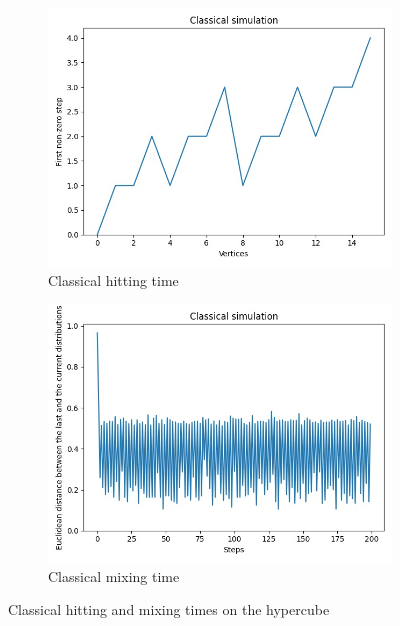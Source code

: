 \begin{figure}[H]
  \centering
  \begin{subfigure}{.45\linewidth}
    \centering
    \includegraphics[width=\linewidth]{./figures/results/hypercube/classical_hitting_time.jpg}
    \caption{Classical hitting time}
  \end{subfigure}
  \begin{subfigure}{.45\linewidth}
    \centering
    \includegraphics[width=\linewidth]{./figures/results/hypercube/classical_mixing_time.jpg}
    \caption{Classical mixing time}
  \end{subfigure}
  \caption{Classical hitting and mixing times on the hypercube}
\end{figure}

